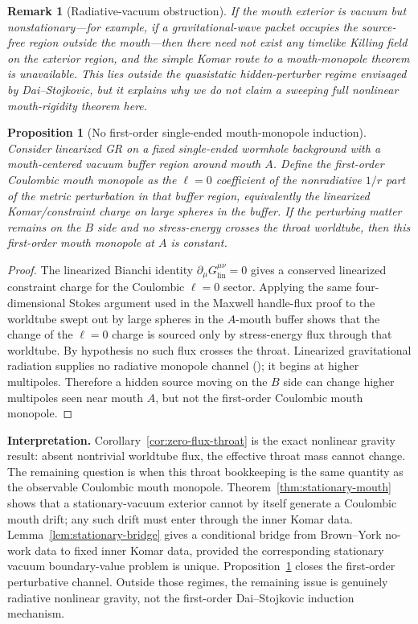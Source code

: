 \documentclass[aps,prd,onecolumn,nofootinbib,superscriptaddress]{revtex4-2}
\newtheorem{proposition}{Proposition}
\newtheorem{remark}{Remark}
\begin{document}
\begin{remark}[Radiative-vacuum obstruction]
\label{rem:mouth-obstruction}
If the mouth exterior is vacuum but nonstationary---for example, if a
gravitational-wave packet occupies the source-free region outside the
mouth---then there need not exist any timelike Killing field on the exterior
region, and the simple Komar route to a mouth-monopole theorem is unavailable.
This lies outside the quasistatic hidden-perturber regime envisaged by
Dai--Stojkovic, but it explains why we do not claim a sweeping full nonlinear
mouth-rigidity theorem here.
\end{remark}

\begin{proposition}[No first-order single-ended mouth-monopole induction]
\label{prop:linearized-mouth}
Consider linearized GR on a fixed single-ended wormhole background with a
mouth-centered vacuum buffer region around mouth $A$.  Define the first-order
Coulombic mouth monopole as the $\ell=0$ coefficient of the nonradiative
$1/r$ part of the metric perturbation in that buffer region, equivalently the
linearized Komar/constraint charge on large spheres in the buffer.  If the
perturbing matter remains on the $B$ side and no stress-energy crosses the
throat worldtube, then this first-order mouth monopole at $A$ is constant.
\end{proposition}

\begin{proof}
The linearized Bianchi identity
$\partial_\mu G^{\mu\nu}_{\text{lin}}=0$ gives a conserved linearized
constraint charge for the Coulombic $\ell=0$ sector.  Applying the same
four-dimensional Stokes argument used in the Maxwell handle-flux proof to the
worldtube swept out by large spheres in the $A$-mouth buffer shows that the
change of the $\ell=0$ charge is sourced only by stress-energy flux through
that worldtube.  By hypothesis no such flux crosses the throat.  Linearized
gravitational radiation supplies no radiative monopole channel
(\cite{Thorne1980Multipole}); it begins at higher multipoles.  Therefore a
hidden source moving on the $B$ side can change higher multipoles seen near
mouth $A$, but not the first-order Coulombic mouth monopole.
\end{proof}

\textbf{Interpretation.}  Corollary~\ref{cor:zero-flux-throat} is the exact
nonlinear gravity result: absent nontrivial worldtube flux, the effective
throat mass cannot change.  The remaining question is when this throat
bookkeeping is the same quantity as the observable Coulombic mouth monopole.
Theorem~\ref{thm:stationary-mouth} shows that a stationary-vacuum exterior
cannot by itself generate a Coulombic mouth drift; any such drift must enter
through the inner Komar data.  Lemma~\ref{lem:stationary-bridge} gives a
conditional bridge from Brown--York no-work data to fixed inner Komar data,
provided the corresponding stationary vacuum boundary-value problem is unique.
Proposition~\ref{prop:linearized-mouth} closes the first-order perturbative
channel.  Outside those regimes, the remaining issue is genuinely radiative
nonlinear gravity, not the first-order Dai--Stojkovic induction mechanism.
\end{document}
